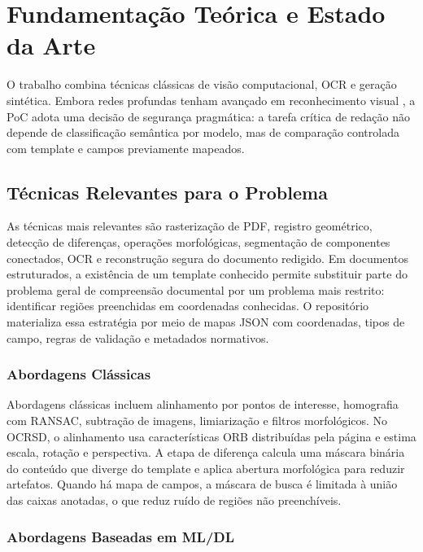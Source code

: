 \documentclass[12pt,a4paper]{article}
\begin{document}
\section{Fundamentação Teórica e Estado da Arte}
\label{sec:fundamentacao}

O trabalho combina técnicas clássicas de visão computacional, OCR e geração sintética. Embora redes profundas tenham avançado em reconhecimento visual \cite{goodfellow2016deep,he2016deep,dosovitskiy2020image}, a PoC adota uma decisão de segurança pragmática: a tarefa crítica de redação não depende de classificação semântica por modelo, mas de comparação controlada com template e campos previamente mapeados.

\subsection{Técnicas Relevantes para o Problema}

As técnicas mais relevantes são rasterização de PDF, registro geométrico, detecção de diferenças, operações morfológicas, segmentação de componentes conectados, OCR e reconstrução segura do documento redigido. Em documentos estruturados, a existência de um template conhecido permite substituir parte do problema geral de compreensão documental por um problema mais restrito: identificar regiões preenchidas em coordenadas conhecidas. O repositório materializa essa estratégia por meio de mapas JSON com coordenadas, tipos de campo, regras de validação e metadados normativos.

\subsubsection{Abordagens Clássicas}

Abordagens clássicas incluem alinhamento por pontos de interesse, homografia com RANSAC, subtração de imagens, limiarização e filtros morfológicos. No OCRSD, o alinhamento usa características ORB distribuídas pela página e estima escala, rotação e perspectiva. A etapa de diferença calcula uma máscara binária do conteúdo que diverge do template e aplica abertura morfológica para reduzir artefatos. Quando há mapa de campos, a máscara de busca é limitada à união das caixas anotadas, o que reduz ruído de regiões não preenchíveis.

\subsubsection{Abordagens Baseadas em ML/DL}
\end{document}
